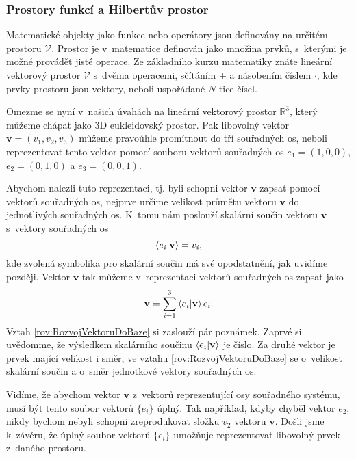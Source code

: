\subsubsection{Prostory funkcí a Hilbertův prostor}
\label{kap:ProstoryFunkci}

Matematické objekty jako funkce nebo operátory jsou definovány na určitém prostoru $\mathcal{V}$. Prostor je v~matematice definován jako množina prvků, s~kterými je možné provádět jisté operace. Ze základního kurzu matematiky znáte lineární vektorový prostor $\mathcal{V}$ s~dvěma operacemi, sčítáním $+$ a násobením číslem $\cdot$, kde prvky prostoru jsou vektory, neboli uspořádané $N$-tice čísel.

Omezme se nyní v~našich úvahách na lineární vektorový prostor $\mathbb{R}^3$, který můžeme chápat jako 3D eukleidovský prostor. Pak libovolný vektor $\mathbf{v} = (v_1, v_2, v_3)$ můžeme pravoúhle promítnout do tří souřadných os, neboli reprezentovat tento vektor pomocí souboru vektorů souřadných os $e_1 = (1, 0, 0)$, $e_2 = (0, 1, 0)$ a $e_3 = (0, 0, 1)$.

Abychom nalezli tuto reprezentaci, tj. byli schopni vektor $\mathbf{v}$ zapsat pomocí vektorů souřadných os, nejprve určíme velikost průmětu vektoru $\mathbf{v}$ do jednotlivých souřadných os. K~tomu nám poslouží skalární součin vektoru $\mathbf{v}$ s~vektory souřadných os
\begin{equation}
\braket{e_i|\mathbf{v}} = v_i,
\nonumber
\end{equation}
kde zvolená symbolika pro skalární součin má své opodstatnění, jak uvidíme později. Vektor $\mathbf{v}$ tak můžeme v~reprezentaci vektorů souřadných os zapsat jako
\begin{equation}
\mathbf{v} = \sum_{i=1}^{3} \braket{e_i|\mathbf{v}} e_i.
\label{rov:RozvojVektoruDoBaze}
\end{equation}
Vztah \eqref{rov:RozvojVektoruDoBaze} si zaslouží pár poznámek. Zaprvé si uvědomme, že výsledkem skalárního součinu $\braket{e_i|\mathbf{v}}$ je číslo. Za druhé vektor je prvek mající velikost i směr, ve vztahu \eqref{rov:RozvojVektoruDoBaze} se o~velikost  skalární součin a o~směr jednotkové vektory souřadných os.

Vidíme, že abychom vektor $\mathbf{v}$  z~vektorů reprezentující osy souřadného systému, musí být tento soubor vektorů $\{e_i\}$ úplný. Tak například, kdyby chyběl vektor $e_2$, nikdy bychom nebyli schopni zreprodukovat složku $v_2$ vektoru $\mathbf{v}$. Došli jsme k~závěru, že úplný soubor vektorů $\{e_i\}$ umožňuje reprezentovat libovolný prvek z~daného prostoru.

